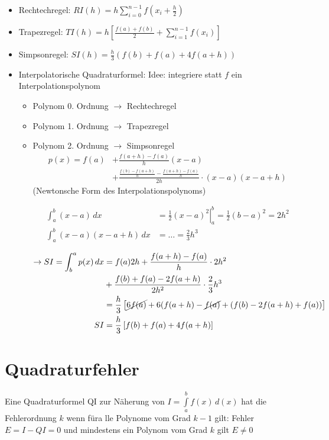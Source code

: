 \documentclass[a4paper,ngerman]{scrbook}
\begin{document}
\begin{itemize}
\item Rechtechregel: $RI(h) = h\sum\limits_{i=0}^{n-1}   f\left(x_i+\frac{h}{2}\right)$

\item Trapezregel: $TI(h) = h\left[\frac{f(a) + f(b)}{2} + \sum\limits_{i=1}^{n-1} f(x_i)\right]$
\item Simpsonregel: $SI(h) = \frac{h}{3}(f(b) + f(a) + 4f(a+h))$
\item Interpolatorische Quadraturformel: Idee: integriere statt $f$ ein Interpolationspolynom
\begin{itemize}
\item Polynom 0. Ordnung $\to$ Rechtechregel
\item Polynom 1. Ordnung $\to$ Trapezregel
\item Polynom 2. Ordnung $\to$ Simpsonregel
  \begin{align*}
    p(x) = f(a) &+ \frac{f(a + h) - f(a)}{h}(x-a)\\
    &+ \frac{\frac{f(b) - f(a+h)}{h} - \frac{f(a+h)-f(a)}{h}}{2h}\cdot(x-a)(x-a+h)
  \end{align*}
(Newtonsche Form des Interpolationspolynoms)


\begin{align*}
  \int_a^b (x-a)\, dx &= \left.\frac{1}{2} (x-a)^2 \right|_a^b =   \frac{1}{2} (b-a)^2 = 2h^2\\
\int_a^b (x-a)(x-a+h)\, dx &= \dots = \frac{2}{3}h^3\\
\end{align*}
\begin{align*}
  \to SI = \int_b^a p(x)\, dx &= f(a)2h + \frac{f(a+h) -f(a)}{h}\cdot   2h^2\\
&+ \frac{f(b)+f(a)-2f(a+h)}{2h^2}\cdot\frac{2}{3}h^3\\
&= \frac{h}{3}\left[ \cancel{6f(a)} + 6(f(a+h) - \cancel{f(a)} + (f(b) - 2f(a+h)+f(a)) \right]\\
SI &= \frac{h}{3}\left[ f(b) + f(a) + 4f(a+h) \right]
\end{align*}
\end{itemize}
\end{itemize}

\section*{Quadraturfehler}

Eine Quadraturformel QI zur Näherung von $I = \int\limits_a^b f(x)\, d(x)$ hat die Fehlerordnung $k$ wenn füra lle Polynome vom Grad $k-1$ gilt: Fehler $E = I-QI = 0$ und mindestens ein Polynom vom Grad $k$ gilt $E \neq 0$
\end{document}
